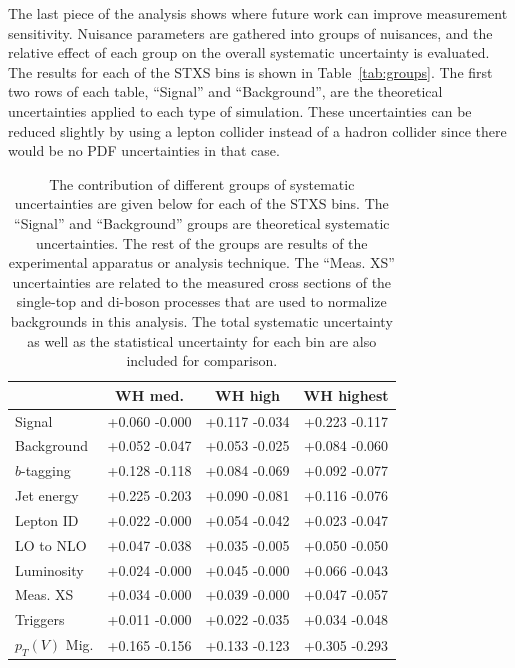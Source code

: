 The last piece of the analysis shows where future work can improve measurement sensitivity.
Nuisance parameters are gathered into groups of nuisances, and the relative effect of each group on the overall
systematic uncertainty is evaluated.
The results for each of the STXS bins is shown in Table~\ref{tab:groups}.
The first two rows of each table, ``Signal'' and ``Background'', are the theoretical uncertainties applied
to each type of simulation.
These uncertainties can be reduced slightly by using a lepton collider instead of a hadron collider
since there would be no PDF uncertainties in that case.
%
\begin{table}
  \centering
  \caption[Contributions of systematic uncertainties groups to result]{
    The contribution of different groups of systematic uncertainties are given below for each of the STXS bins.
    The ``Signal'' and ``Background'' groups are theoretical systematic uncertainties.
    The rest of the groups are results of the experimental apparatus or analysis technique.
    The ``Meas. XS'' uncertainties are related to the measured cross sections of
    the single-top \cite{2017752} and di-boson \cite{2017533}
    processes that are used to normalize backgrounds in this analysis.
    The total systematic uncertainty as well as the statistical uncertainty for each bin are also included
    for comparison.
  }
  \begin{tabular}{|l|c|c|c|}
    \hline
& WH med. & WH high & WH highest \\
\hline
Signal & {+0.060} {-0.000} & {+0.117} {-0.034} & {+0.223} {-0.117}\\
Background & {+0.052} {-0.047} & {+0.053} {-0.025} & {+0.084} {-0.060}\\
\hline
$b$-tagging & {+0.128} {-0.118} & {+0.084} {-0.069} & {+0.092} {-0.077}\\
Jet energy & {+0.225} {-0.203} & {+0.090} {-0.081} & {+0.116} {-0.076}\\
Lepton ID & {+0.022} {-0.000} & {+0.054} {-0.042} & {+0.023} {-0.047}\\
LO to NLO & {+0.047} {-0.038} & {+0.035} {-0.005} & {+0.050} {-0.050}\\
Luminosity & {+0.024} {-0.000} & {+0.045} {-0.000} & {+0.066} {-0.043}\\
Meas. XS & {+0.034} {-0.000} & {+0.039} {-0.000} & {+0.047} {-0.057}\\
Triggers & {+0.011} {-0.000} & {+0.022} {-0.035} & {+0.034} {-0.048}\\
$p_T(V)$ Mig. & {+0.165} {-0.156} & {+0.133} {-0.123} & {+0.305} {-0.293}\\

\end{tabular}
\end{table}
